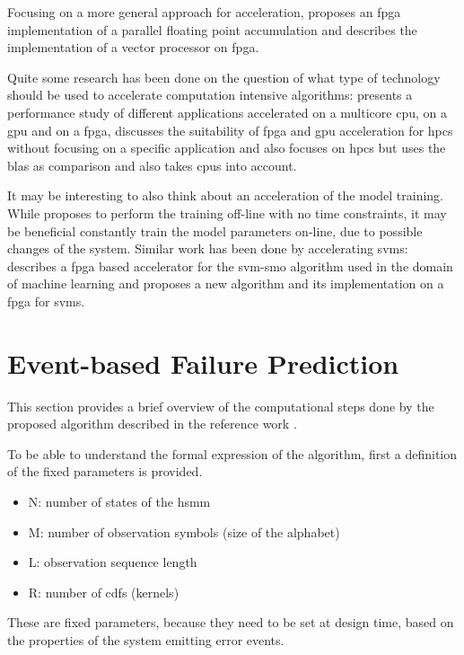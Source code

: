 \documentclass[mscthesis]{usiinfthesis}
\begin{document}
Focusing on a more general approach for acceleration, \cite{ARITH13_Kadric}
proposes an \gls{fpga} implementation of a parallel floating point accumulation
and \cite{ITNG07_Yang} describes the implementation of a vector processor on
\gls{fpga}.

Quite some research has been done on the question of what type of technology
should be used to accelerate computation intensive algorithms:
\cite{SASP08_Che} presents a performance study of different applications
accelerated on a multicore \gls{cpu}, on a \gls{gpu} and on a \gls{fpga},
\cite{FPL10_Jones} discusses the suitability of \gls{fpga} and \gls{gpu}
acceleration for \gls{hpcs} without focusing on a specific application and
\cite{ISVLSI10_Kestur} also focuses on \gls{hpcs} but uses the \gls{blas} as
comparison and also takes \glspl{cpu} into account.

It may be interesting to also think about an acceleration of the model
training. While \cite{salfner08} proposes to perform the training off-line with
no time constraints, it may be beneficial constantly train the model parameters
on-line, due to possible changes of the system. Similar work has been done by
accelerating \glspl{svm}: \cite{FCCM09_Cadambi} describes a \gls{fpga} based
accelerator for the \gls{svm}-\gls{smo} algorithm used in the domain of machine
learning and \cite{IEEE03_Anguita} proposes a new algorithm and its
implementation on a \gls{fpga} for \glspl{svm}.

\chapter{Event-based Failure Prediction}
\label{ch:event}
\glsresetall %

This section provides a brief overview of the computational steps done by the
proposed algorithm described in the reference work \cite{salfner08}.

To be able to understand the formal expression of the algorithm, first
a definition of the fixed parameters is provided.
\begin{itemize}
    \item N: number of states of the \gls{hsmm}
    \item M: number of observation symbols (size of the alphabet)
    \item L: observation sequence length
    \item R: number of \glspl{cdf} (kernels)
\end{itemize}
These are fixed parameters, because they need to be set at design time,
based on the properties of the system emitting error events.
\end{document}
